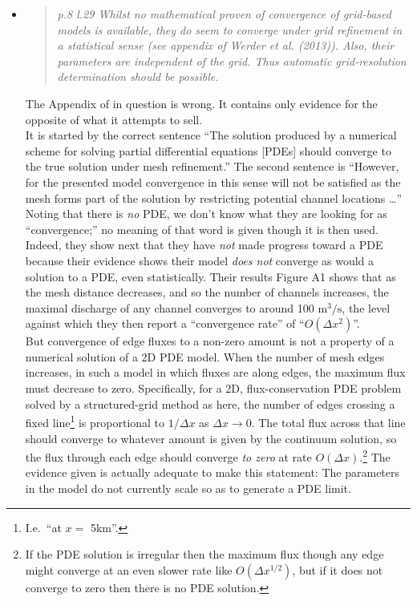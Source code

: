 \documentclass[11pt,reqno]{amsart}
\newcommand{\reply}[2]{
\medskip\medskip
\item  \begin{quote}
\emph{#1}
\end{quote}

\medskip
\noindent #2}
\begin{document}
\begin{itemize}
\reply{p.8 l.29 Whilst no mathematical proven of convergence of grid-based models is available,  they do seem to converge under grid refinement in a statistical sense (see appendix of Werder et al. (2013)).  Also, their parameters are independent of the grid.  Thus automatic grid-resolution determination should be possible.}
{The Appendix of \cite{Werderetal2013} in question is wrong.  It contains only evidence for the opposite of what it attempts to sell. \\
\indent It is started by the correct sentence ``The solution produced by a numerical scheme for solving partial differential equations [PDEs] should converge to the true solution under mesh refinement.''  The second sentence is ``However, for the presented model convergence in this sense will not be satisfied as the mesh forms part of the solution by restricting potential channel locations \dots''  Noting that there is \emph{no} PDE, we don't know what they are looking for as ``convergence;'' no meaning of that word is given though it is then used.  \\
\indent Indeed, they show next that they have \emph{not} made progress toward a PDE because their evidence shows their model \emph{does not} converge as would a solution to a PDE, even statistically.  Their results Figure A1 shows that as the mesh distance decreases, and so the number of channels increases, the maximal discharge of any channel converges to around 100 $\text{m}^3/\text{s}$, the level against which they then report a ``convergence rate'' of ``$O(\Delta x^2)$''. \\
\indent But convergence of edge fluxes to a non-zero amount is not a property of a numerical solution of a 2D PDE model.  When the number of mesh edges increases, in such a model in which fluxes are along edges, the maximum flux must decrease to zero.  Specifically, for a 2D, flux-conservation PDE problem solved by a structured-grid method as here, the number of edges crossing a fixed line\footnote{I.e.~``at $x=$ 5km''.} is proportional to $1/\Delta x$ as $\Delta x\to 0$.  The total flux across that line should converge to whatever amount is given by the continuum solution, so the flux through each edge should converge \emph{to zero} at rate $O(\Delta x)$.\footnote{If the PDE solution is irregular then the maximum flux though any edge might converge at an even slower rate like $O(\Delta x^{1/2})$, but if it does not converge to zero then there is no PDE solution.}  The evidence given is actually adequate to make this statement: The parameters in the model do not currently scale so as to generate a PDE limit. \\
}
\end{itemize}
\end{document}
